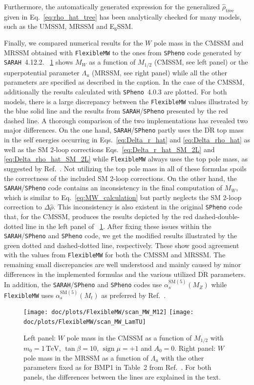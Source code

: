 \documentclass[final,3p,11pt,pdflatex]{elsarticle}
\makeatletter
\newcommand{\sarah}{\texttt{SARAH}\@\xspace}
\newcommand{\spheno}{\texttt{SPheno}\@\xspace}
\newcommand{\fmw}{\texttt{FlexibleMW}\@\xspace}
\newcommand{\ESSM}{E$_6$SSM\@\xspace}
\newcommand{\ol}[1]{\overline{#1}}
\newcommand{\DRbar}{\ensuremath{\ol{\text{DR}}}\xspace}
\newcommand{\unit}[1]{\,\text{#1}}      %
\newcommand{\SM}{\ensuremath{\text{SM}}\xspace}
\newcommand{\figref}[1]{\figurename~\ref{#1}}
\newcommand{\azero}{\ensuremath{A_0}\xspace}
\newcommand{\mhalf}{\ensuremath{M_{1/2}}\xspace}
\newcommand{\mzero}{\ensuremath{m_0}\xspace}
\DeclareMathOperator{\sign}{sign}
\def\as{\alpha_s}
\makeatother
\begin{document}
Furthermore, the automatically generated expression for the
generalized $\hat\rho_\text{tree}$ given in Eq.~\eqref{eq:rho_hat_tree}
has been analytically checked for many models, such as the UMSSM,
MRSSM and \ESSM.

Finally, we compared numerical results for the $W$ pole mass in the
CMSSM and MRSSM obtained with \fmw to the ones from \spheno code
generated by \sarah~4.12.2. \figref{fig:FlexibleMW_vs_SPheno} shows $M_W$
as a function of $\mhalf$ (CMSSM, see left panel) or the superpotential
parameter $\Lambda_u$ (MRSSM, see right panel) while all
the other parameters are specified as described in the caption.
In the case of the CMSSM, additionally the results calculated with
\spheno~4.0.3 are plotted. For both models, there is a large
discrepancy between the \fmw values illustrated by the blue solid
line and the results from \sarah/\spheno presented by the red dashed
line. A thorough comparison of the two implementations has revealed
two major differences. On the one hand, \sarah/\spheno partly uses the
\DRbar top mass in the self energies occurring in
Eqs.~\eqref{eq:Delta_r_hat} and \eqref{eq:Delta_rho_hat} as well as
the SM 2-loop corrections Eqs.~\eqref{eq:Delta_r_hat_SM_2L} and
\eqref{eq:Delta_rho_hat_SM_2L} while \fmw always uses the top pole mass,
as suggested by Ref.~\cite{Fanchiotti:1992tu}. Not utilizing the top
pole mass in all of these formulas spoils the correctness of the
included SM 2-loop corrections. On the other hand, the
\sarah/\spheno code contains an inconsistency in the final computation of
$M_W$, which is similar to Eq.~\eqref{eq:MW_calculation} but partly
neglects the SM 2-loop correction to $\Delta\hat\rho$.
This inconsistency is also existent in the original \spheno code that,
for the CMSSM, produces the results depicted by the red dashed-double-dotted
line in the left panel of \figref{fig:FlexibleMW_vs_SPheno}.
After fixing these issues within the \sarah/\spheno and \spheno code,
we get the modified results illustrated by the green dotted and
dashed-dotted line, respectively. These show good agreement with the
values from \fmw for both the CMSSM and MRSSM\@.
The remaining small discrepancies are well
understood and mainly caused by minor differences in the implemented
formulas and the various utilized \DRbar parameters. In addition,
the \sarah/\spheno and \spheno codes use $\as^{\SM(5)}(M_Z)$ while \fmw uses
$\as^{\SM(5)}(M_t)$ as preferred by Ref.~\cite{Fanchiotti:1992tu}.
%
\begin{figure}[tbh]
  \centering
  \texttt{[image: doc/plots/FlexibleMW/scan\_MW\_M12]}\hfill
  \texttt{[image: doc/plots/FlexibleMW/scan\_MW\_LamTU]}
  \caption{Left panel: $W$ pole mass in the CMSSM as a function of
  $\mhalf$ with $\mzero = 1\unit{TeV}$, $\tan\beta = 10$,
  $\sign\mu = +1$ and $\azero = 0$. Right panel: $W$ pole mass in
  the MRSSM as a function of $\Lambda_u$ with the other parameters
  fixed as for BMP1 in Table~2 from Ref.~\cite{Diessner:2014ksa}.
  For both panels, the differences between the lines are explained
  in the text.}
  \label{fig:FlexibleMW_vs_SPheno}
\end{figure}
%
\end{document}
